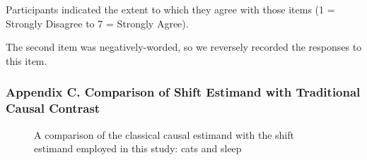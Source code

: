 \documentclass[
  singlecolumn,
  9pt]{article}
\begin{document}
Participants indicated the extent to which they agree with those items
(1 = Strongly Disagree to 7 = Strongly Agree).

The second item was negatively-worded, so we reversely recorded the
responses to this item.

\newpage{}

\subsubsection{Appendix C. Comparison of Shift Estimand with Traditional
Causal
Contrast}\label{appendix-c.-comparison-of-shift-estimand-with-traditional-causal-contrast}

\begin{figure}


\caption{\label{fig-comparative-graph-cats}A comparison of the classical
causal estimand with the shift estimand employed in this study: cats and
sleep}

\end{figure}%

\newpage{}
\end{document}
